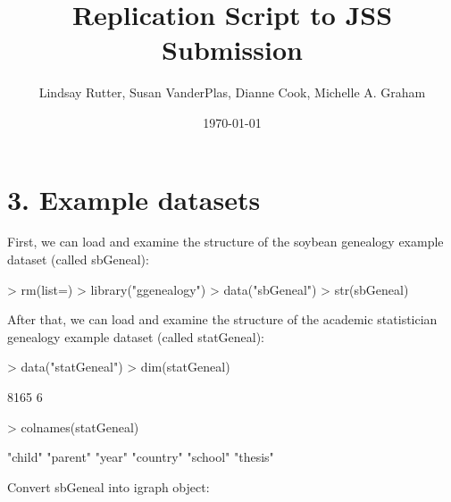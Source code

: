 \documentclass{article}
\title{Replication Script to JSS Submission}
\begin{document}
\author{Lindsay Rutter, Susan VanderPlas, Dianne Cook, Michelle A. Graham}
\date{\today}
\maketitle

\tableofcontents

\section*{3. Example datasets}

First, we can load and examine the structure of the soybean genealogy example dataset (called sbGeneal):

\begin{Schunk}
\begin{Sinput}
> rm(list=)
> library("ggenealogy")
> data("sbGeneal")
> str(sbGeneal)
\end{Sinput}
\end{Schunk}

After that, we can load and examine the structure of the academic statistician genealogy example dataset (called statGeneal):

\begin{Schunk}
\begin{Sinput}
> data("statGeneal")
> dim(statGeneal)
\end{Sinput}
\begin{Soutput}
[1] 8165    6
\end{Soutput}
\begin{Sinput}
> colnames(statGeneal)
\end{Sinput}
\begin{Soutput}
[1] "child"   "parent"  "year"    "country" "school"  "thesis" 
\end{Soutput}
\end{Schunk}

Convert sbGeneal into igraph object:
\end{document}
